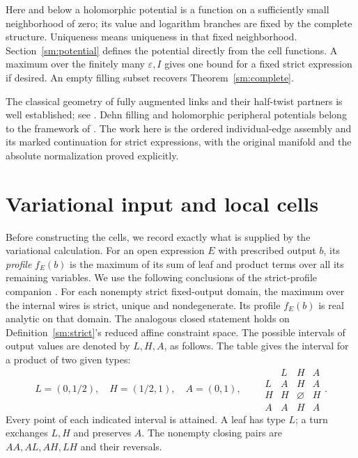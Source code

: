 \documentclass[11pt]{article}
\numberwithin{equation}{section}
\theoremstyle{definition}\newtheorem{definition}[theorem]{Definition}
\theoremstyle{remark}\newtheorem{remark}[theorem]{Remark}
\newcommand{\eps}{\varepsilon}
\begin{document}
Here and below a holomorphic potential is a function on a sufficiently
small neighborhood of zero; its value and logarithm branches are fixed
by the complete structure. Uniqueness means uniqueness in that fixed
neighborhood. Section~\ref{sm:potential} defines the potential directly
from the cell functions. A maximum over the finitely many $\eps,I$ gives one bound
for a fixed strict expression if desired. An empty filling subset
recovers Theorem~\ref{sm:complete}.

The classical geometry of fully augmented links and their half-twist
partners is well established; see \cite{Purcell}. Dehn filling and
holomorphic peripheral potentials belong to the framework of
\cite{NZ}. The work here is the ordered individual-edge assembly and
its marked continuation for strict expressions, with the original
manifold and the absolute normalization proved explicitly.

\section{Variational input and local cells}\label{sm:variational}

Before constructing the cells, we record exactly what is supplied by
the variational calculation. For an open expression $E$ with prescribed
output $b$, its \emph{profile} $f_E(b)$ is the maximum of its sum of
leaf and product terms over all its remaining variables.
We use the following conclusions of the strict-profile
companion \cite[Lemma~5.2, Theorem~6.4, Lemma~7.1 and
Proposition~7.2]{Newton}.
For each nonempty strict fixed-output domain, the maximum over the
internal wires is strict, unique and nondegenerate. Its profile $f_E(b)$
is real analytic on that domain. The analogous closed statement holds
on Definition~\ref{sm:strict}'s reduced affine constraint space.
The possible intervals of output values are denoted by $L,H,A$, as follows. The table gives the interval for a product of two given types:
\begin{equation}\label{sm:types}
 L=(0,1/2),\quad H=(1/2,1),\quad A=(0,1),\qquad
 \begin{array}{c|ccc}
    &L&H&A\\\hline
 L&A&H&A\\ H&H&\varnothing&H\\ A&A&H&A
 \end{array}.
\end{equation}
Every point of each indicated interval is attained. A leaf has type
$L$; a turn exchanges $L,H$ and preserves $A$. The nonempty closing
pairs are $AA,AL,AH,LH$ and their reversals.
\end{document}
